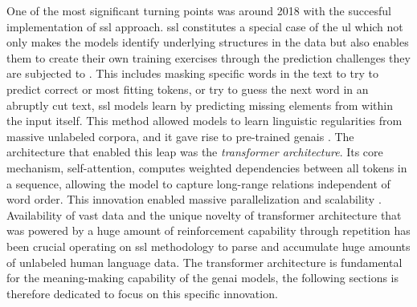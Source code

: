
One of the most significant turning points was around 2018 with the succesful implementation of \gls{ssl} approach. \Gls{ssl} constitutes a special case of the \gls{ul} which not only makes the models identify underlying structures in the data but also enables them to create their own training exercises through the prediction challenges they are subjected to \parencite[129]{manning2022a}. This includes masking specific words in the text to try to predict correct or most fitting \gls{tokens}, or try to guess the next word in an abruptly cut text, \gls{ssl} models learn by predicting missing elements from within the input itself. This method allowed models to learn linguistic regularities from massive unlabeled corpora, and it gave rise to pre-trained \glspl{genai} \parencite{maas2023}. The architecture that enabled this leap was the \textit{transformer architecture}. Its core mechanism, self-attention, computes weighted dependencies between all tokens in a sequence, allowing the model to capture long-range relations independent of word order. This innovation enabled massive parallelization and scalability \parencite{maas2023}. Availability of vast data and the unique novelty of transformer architecture that was powered by a huge amount of reinforcement capability through repetition has been crucial operating on \gls{ssl} methodology to parse and accumulate huge amounts of unlabeled human language data. The transformer architecture is fundamental for the meaning-making capability of the \gls{genai} models, the following sections is therefore dedicated to focus on this specific innovation.







